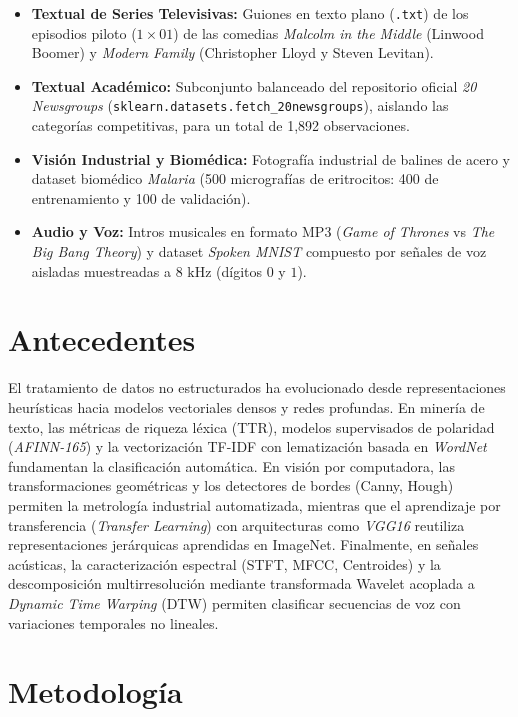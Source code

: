 \documentclass[12pt]{article}
\begin{document}
\begin{itemize}
    \item \textbf{Textual de Series Televisivas:} Guiones en texto plano (\texttt{.txt}) de los episodios piloto ($1\times01$) de las comedias \textit{Malcolm in the Middle} (Linwood Boomer) y \textit{Modern Family} (Christopher Lloyd y Steven Levitan).
    \item \textbf{Textual Académico:} Subconjunto balanceado del repositorio oficial \textit{20 Newsgroups} (\texttt{sklearn.datasets.fetch\_20newsgroups}), aislando las categorías competitivas, para un total de 1,892 observaciones.
    \item \textbf{Visión Industrial y Biomédica:} Fotografía industrial de balines de acero y dataset biomédico \textit{Malaria} (500 micrografías de eritrocitos: 400 de entrenamiento y 100 de validación).
    \item \textbf{Audio y Voz:} Intros musicales en formato MP3 (\textit{Game of Thrones} vs \textit{The Big Bang Theory}) y dataset \textit{Spoken MNIST} compuesto por señales de voz aisladas muestreadas a $8\text{ kHz}$ (dígitos $0$ y $1$).
\end{itemize}

\section{Antecedentes}
El tratamiento de datos no estructurados ha evolucionado desde representaciones heurísticas hacia modelos vectoriales densos y redes profundas. En minería de texto, las métricas de riqueza léxica (TTR), modelos supervisados de polaridad (\textit{AFINN-165}) y la vectorización TF-IDF con lematización basada en \textit{WordNet} fundamentan la clasificación automática. En visión por computadora, las transformaciones geométricas y los detectores de bordes (Canny, Hough) permiten la metrología industrial automatizada, mientras que el aprendizaje por transferencia (\textit{Transfer Learning}) con arquitecturas como \textit{VGG16} reutiliza representaciones jerárquicas aprendidas en ImageNet. Finalmente, en señales acústicas, la caracterización espectral (STFT, MFCC, Centroides) y la descomposición multirresolución mediante transformada Wavelet acoplada a \textit{Dynamic Time Warping} (DTW) permiten clasificar secuencias de voz con variaciones temporales no lineales.

\section{Metodología}
\end{document}
